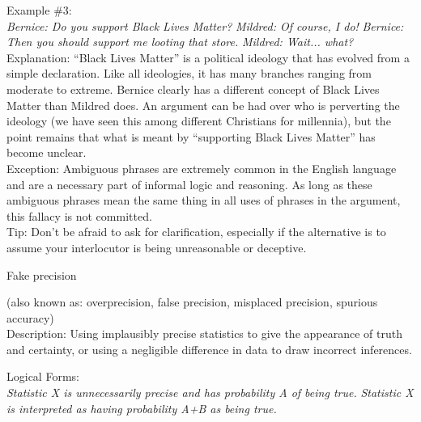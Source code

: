 \documentclass[a4paper,12pt,single,pdftex]{scrartcl}
\begin{document}
{    
      Example \#3:
    \\

    
      {\em Bernice: Do you support Black Lives Matter?} \newline
{\em Mildred: Of course, I do!} \newline
{\em Bernice: Then you should support me looting that store.} \newline
{\em Mildred: Wait... what?}
    \\

    
      Explanation: “Black Lives Matter” is a political ideology that has evolved from a simple declaration. Like all ideologies, it has many branches ranging from moderate to extreme. Bernice clearly has a different concept of Black Lives Matter than Mildred does. An argument can be had over who is perverting the ideology (we have seen this among different Christians for millennia), but the point remains that what is meant by “supporting Black Lives Matter” has become unclear.
    \\

    
      Exception: Ambiguous phrases are extremely common in the English language and are a necessary part of informal logic and reasoning.  As long as these ambiguous phrases mean the same thing in all uses of phrases in the argument, this fallacy is not committed.
    \\

    
      Tip: Don’t be afraid to ask for clarification, especially if the alternative is to assume your interlocutor is being unreasonable or deceptive.
    \\

  }


Fake precision
    
      (also known as: overprecision, false precision, misplaced precision, spurious accuracy)
    \\

  
    Description: Using implausibly precise statistics to give the appearance of truth and certainty, or using a negligible difference in data to draw incorrect inferences.

    
      Logical Forms:
    \\

    
      {\em Statistic X is unnecessarily precise and has probability A of being true.} \newline
{\em Statistic X is interpreted as having probability A+B as being true.}
    \\
\end{document}
